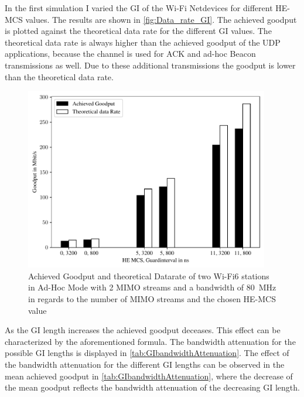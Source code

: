 In the first simulation I varied the \ac{GI} of the Wi-Fi Netdevices for different HE-\ac{MCS} values.
The results are shown in \autoref{fig:Data_rate_GI}. The achieved goodput is plotted against the theoretical data rate for the different \ac{GI} values.
The theoretical data rate is always higher than the achieved goodput of the UDP applications, because the channel is used for \ac{ACK} and ad-hoc Beacon transmissions as well. Due to
these additional transmissions the goodput is lower than the theoretical data rate.
\begin{figure}[H]
	\centering
	\includegraphics[width=0.95\textwidth]{figures/gi_dataRate_simulation.pdf}
	\caption{Achieved Goodput and theoretical Datarate of two Wi-Fi6 stations in Ad-Hoc Mode with \num{2} \acf{MIMO} streams and a bandwidth of \SI{80}{\mega\hertz} in regards to the number of \acf{MIMO} streams and the chosen HE-\acf{MCS} value}%
	\label{fig:Data_rate_GI}%
\end{figure}

As the \ac{GI} length increases the achieved goodput deceases. This effect can be characterized by the aforementioned formula.
The bandwidth attenuation for the possible \ac{GI} lengths is displayed in \autoref{tab:GIbandwidthAttenuation}.
The effect of the bandwidth attenuation for the different \ac{GI} lengths can be observed in the mean achieved goodput in
\autoref{tab:GIbandwidthAttenuation}, where the decrease of the mean goodput reflects the bandwidth attenuation of the decreasing \ac{GI} length.

